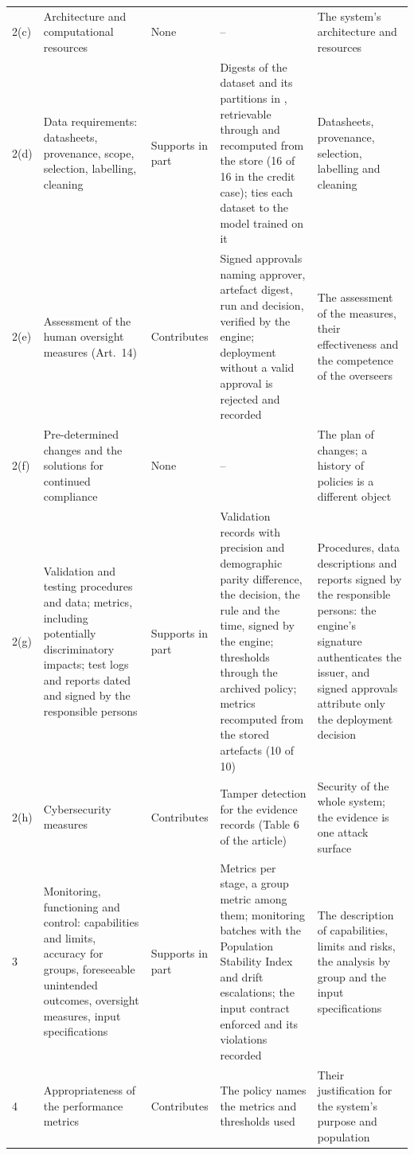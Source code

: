 \documentclass[a4paper,10pt]{article}
\begin{document}
\begin{small}
\begin{longtable}{@{}lP{3.2cm}P{1.7cm}P{4.9cm}P{4.2cm}@{}}
2(c) & Architecture and computational resources & None & -- & The system's architecture and resources \\
2(d) & Data requirements: datasheets, provenance, scope, selection, labelling, cleaning & Supports in part & Digests of the dataset and its partitions in , retrievable through  and recomputed from the store (16 of 16 in the credit case);  ties each dataset to the model trained on it & Datasheets, provenance, selection, labelling and cleaning \\
2(e) & Assessment of the human oversight measures (Art.~14) & Contributes & Signed approvals naming approver, artefact digest, run and decision, verified by the engine; deployment without a valid approval is rejected and recorded & The assessment of the measures, their effectiveness and the competence of the overseers \\
2(f) & Pre-determined changes and the solutions for continued compliance & None & -- & The plan of changes; a history of policies is a different object \\
2(g) & Validation and testing procedures and data; metrics, including potentially discriminatory impacts; test logs and reports dated and signed by the responsible persons & Supports in part & Validation records with precision and demographic parity difference, the decision, the rule and the time, signed by the engine; thresholds through the archived policy; metrics recomputed from the stored artefacts (10 of 10) & Procedures, data descriptions and reports signed by the responsible persons: the engine's signature authenticates the issuer, and signed approvals attribute only the deployment decision \\
2(h) & Cybersecurity measures & Contributes & Tamper detection for the evidence records (Table 6 of the article) & Security of the whole system; the evidence is one attack surface \\
 & Monitoring, functioning and control: capabilities and limits, accuracy for groups, foreseeable unintended outcomes, oversight measures, input specifications & Supports in part & Metrics per stage, a group metric among them; monitoring batches with the Population Stability Index and drift escalations; the input contract enforced and its violations recorded & The description of capabilities, limits and risks, the analysis by group and the input specifications \\
4 & Appropriateness of the performance metrics & Contributes & The policy names the metrics and thresholds used & Their justification for the system's purpose and population \\

\end{longtable}
\end{small}
\end{document}
